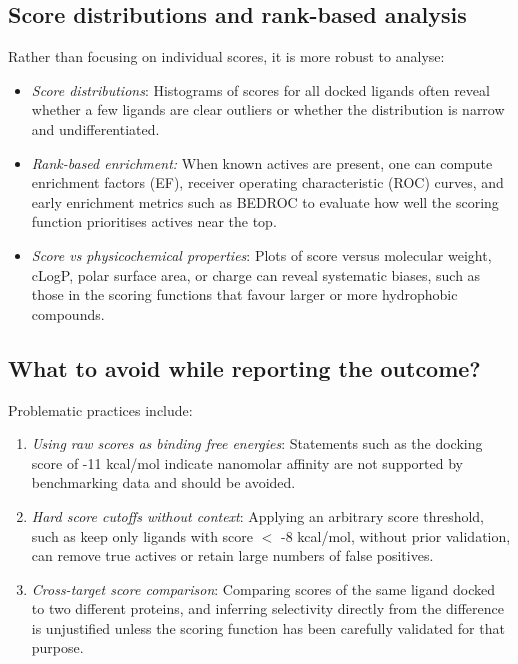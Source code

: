 \documentclass[12pt]{article}
\begin{document}
\subsection{Score distributions and rank-based analysis}

Rather than focusing on individual scores, it is more robust to analyse:

\begin{itemize}
  \item \emph{Score distributions}: Histograms of scores for all docked ligands often reveal whether a few ligands are clear outliers or whether the distribution is narrow and undifferentiated.
  \item \emph{Rank-based enrichment:} When known actives are present, one can compute enrichment factors (EF), receiver operating characteristic (ROC) curves, and early enrichment metrics such as BEDROC to evaluate how well the scoring function prioritises actives near the top.
  \item \emph{Score vs physicochemical properties}: Plots of score versus molecular weight, cLogP, polar surface area, or charge can reveal systematic biases, such as those in the scoring functions that favour larger or more hydrophobic compounds.
\end{itemize}

\subsection{What to avoid while reporting the outcome?}

Problematic practices include:

\begin{enumerate}
  \item \emph{Using raw scores as binding free energies}: Statements such as the docking score of -11 kcal/mol indicate nanomolar affinity are not supported by benchmarking data and should be avoided\cite{CH8_Warren2006}.
  \item \emph{Hard score cutoffs without context}: Applying an arbitrary score threshold, such as keep only ligands with score $<$ -8 kcal/mol, without prior validation, can remove true actives or retain large numbers of false positives.
  \item \emph{Cross-target score comparison}: Comparing scores of the same ligand docked to two different proteins, and inferring selectivity directly from the difference is unjustified unless the scoring function has been carefully validated for that purpose.
\end{enumerate}
\end{document}
